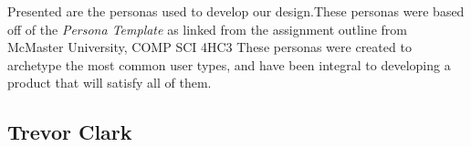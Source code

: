 \documentclass[10pt]{article}
\begin{document}
Presented are the personas used to develop our design.These personas were based off of the \emph{Persona Template} as linked from the assignment outline from McMaster University, COMP SCI 4HC3 These personas were created to archetype the most common user types, and have been integral to developing a product that will satisfy all of them.\\

%


\subsection*{Trevor Clark}
\end{document}
